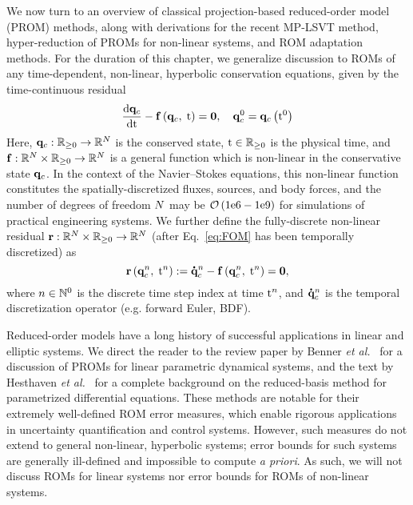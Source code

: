 We now turn to an overview of classical projection-based reduced-order model (PROM) methods, along with derivations for the recent MP-LSVT method, hyper-reduction of PROMs for non-linear systems, and ROM adaptation methods. For the duration of this chapter, we generalize discussion to ROMs of any time-dependent, non-linear, hyperbolic conservation equations, given by the time-continuous residual
%
\begin{equation}\label{eq:FOM}
    \frac{\text{d} \mathbf{q}_{c}}{\text{d} \text{t}} - \mathbf{f} \left(\mathbf{q}_{c}, \; \text{t}\right) = \mathbf{0}, \quad \mathbf{q}_{c}^0 = \mathbf{q}_{c} \left(\text{t}^0\right)
\end{equation}
%
Here, $\mathbf{q}_{c}: \mathbb{R}_{\ge 0} \rightarrow \mathbb{R}^{N}$ is the conserved state, $\text{t} \in \mathbb{R}_{\ge 0}$ is the physical time, and $\mathbf{f}: \mathbb{R}^{N} \times \mathbb{R}_{\ge 0} \rightarrow \mathbb{R}^{N}$ is a general function which is non-linear in the conservative state $\mathbf{q}_{c}$. In the context of the Navier--Stokes equations, this non-linear function constitutes the spatially-discretized fluxes, sources, and body forces, and the number of degrees of freedom $N$ may be $\mathcal{O}\left(1\text{e}6-1\text{e}9\right)$ for simulations of practical engineering systems. We further define the fully-discrete non-linear residual $\mathbf{r}: \mathbb{R}^{N} \times \mathbb{R}_{\ge 0} \rightarrow \mathbb{R}^{N}$ (after Eq.~\ref{eq:FOM} has been temporally discretized) as
%
\begin{equation}
    \mathbf{r}\left(\mathbf{q}_{c}^{n}, \; \text{t}^{n}\right) := \accentset{\mbox{\large\bfseries .}}{\mathbf{q}}_{c}^{n} - \mathbf{f} \left(\mathbf{q}_{c}^{n}, \; \text{t}^{n}\right) = \mathbf{0},
\end{equation}
%
where $n \in \mathbb{N}^0$ is the discrete time step index at time $\text{t}^{n}$, and $\accentset{\mbox{\large\bfseries .}}{\mathbf{q}}_{c}^{n}$ is the temporal discretization operator (e.g. forward Euler, BDF).

Reduced-order models have a long history of successful applications in linear and elliptic systems. We direct the reader to the review paper by Benner \textit{et al.}~\cite{Benner2015} for a discussion of PROMs for linear parametric dynamical systems, and the text by Hesthaven \textit{et al.}~\cite{certRedBasisBook} for a complete background on the reduced-basis method for parametrized differential equations. These methods are notable for their extremely well-defined ROM error measures, which enable rigorous applications in uncertainty quantification and control systems. However, such measures do not extend to general non-linear, hyperbolic systems; error bounds for such systems are generally ill-defined and impossible to compute \textit{a priori}. As such, we will not discuss ROMs for linear systems nor error bounds for ROMs of non-linear systems.